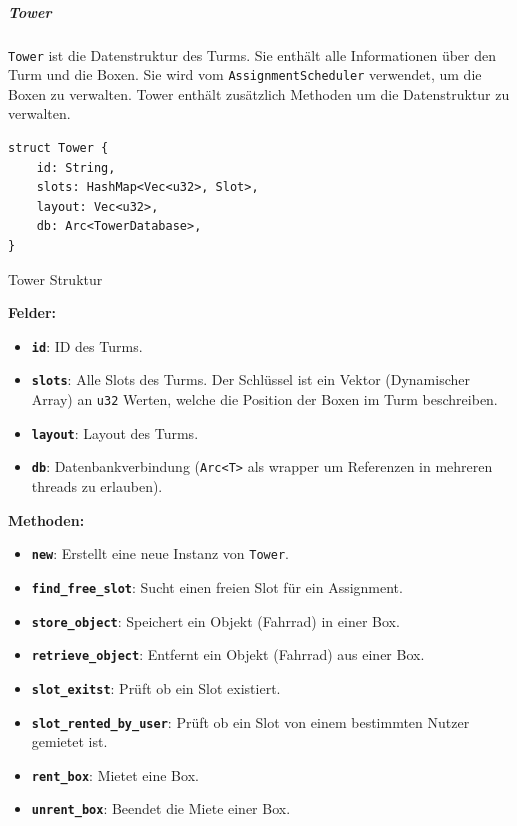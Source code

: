 \subparagraph{Tower}

\texttt{Tower} ist die Datenstruktur des Turms. Sie enthält alle Informationen über den Turm und die Boxen. Sie wird vom \texttt{AssignmentScheduler} verwendet, um die Boxen zu verwalten. Tower enthält zusätzlich Methoden um die Datenstruktur zu verwalten.

\begin{listing}[H]
  \begin{verbatim}
struct Tower {
    id: String,
    slots: HashMap<Vec<u32>, Slot>,
    layout: Vec<u32>,
    db: Arc<TowerDatabase>,
}
\end{verbatim}
  \caption{Tower Struktur}
  \label{lst:tower_struktur}
\end{listing}

\textbf{Felder:}
\begin{itemize}
  \item \textbf{\texttt{id}}: ID des Turms.
  \item \textbf{\texttt{slots}}: Alle Slots des Turms. Der Schlüssel ist ein Vektor (Dynamischer Array) an \texttt{u32} Werten, welche die Position der Boxen im Turm beschreiben.
  \item \textbf{\texttt{layout}}: Layout des Turms.
  \item \textbf{\texttt{db}}: Datenbankverbindung (\texttt{Arc<T>} als \Gls{wrapper} um Referenzen in mehreren \Glspl{thread} zu erlauben).
\end{itemize}

\textbf{Methoden:}
\begin{itemize}
  \item \textbf{\texttt{new}}: Erstellt eine neue Instanz von \texttt{Tower}.
  \item \textbf{\texttt{find\_free\_slot}}: Sucht einen freien Slot für ein Assignment.
  \item \textbf{\texttt{store\_object}}: Speichert ein Objekt (Fahrrad) in einer Box.
  \item \textbf{\texttt{retrieve\_object}}: Entfernt ein Objekt (Fahrrad) aus einer Box.
  \item \textbf{\texttt{slot\_exitst}}: Prüft ob ein Slot existiert.
  \item \textbf{\texttt{slot\_rented\_by\_user}}: Prüft ob ein Slot von einem bestimmten Nutzer gemietet ist.
  \item \textbf{\texttt{rent\_box}}: Mietet eine Box.
        \item\textbf{\texttt{unrent\_box}}: Beendet die Miete einer Box.
\end{itemize}


